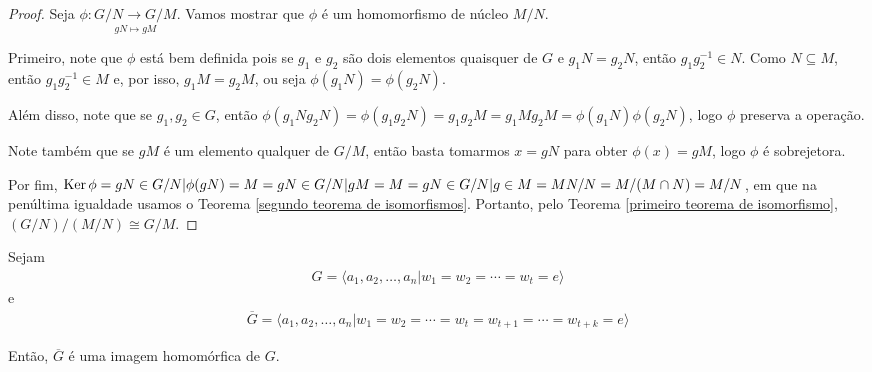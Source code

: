 	\begin{proof}
		Seja $\phi:\underset{gN\mapsto gM}{G/N\to G/M}$. Vamos mostrar que $\phi$ é um homomorfismo 
		de núcleo $M/N$.
		\par\vspace{0.3cm} Primeiro, note que $\phi$ está bem definida pois se $g_1$ e $g_2$ são 
		dois elementos quaisquer de $G$ e $g_1N=g_2N$, então $g_1g_2^{-1}\in N$. Como $N\subseteq M$, 
		então $g_1g_2^{-1}\in M$ e, por isso, $g_1M=g_2M$, ou seja $\phi(g_1N)=\phi(g_2N)$.
		
		\par\vspace{0.3cm} Além disso, note que se $g_1,g_2\in G$, então
		$\phi(g_1Ng_2N)=\phi(g_1g_2N)=g_1g_2M=g_1Mg_2M=\phi(g_1N)\phi(g_2N)$, logo $\phi$ preserva a operação.
		
		\par\vspace{0.3cm} Note também que se $gM$ é um elemento qualquer de $G/M$, então basta tomarmos 
		$x=gN$ para obter $\phi(x)=gM$, logo $\phi$ é sobrejetora.
		
		\par\vspace{0.3cm} Por fim,  $\operatorname{Ker}\phi={gN\in G/N|\phi(gN)=M}={gN\in G/N|gM=M}
		={gN\in G/N|g\in M}=MN/N=M/(M\cap N)=M/N$, em que na penúltima igualdade usamos o 
		Teorema \eqref{segundo teorema de isomorfismos}. Portanto, pelo 
		Teorema \eqref{primeiro teorema de isomorfismo}, $(G/N)/(M/N)\cong G/M$. 
	\end{proof}
	\begin{theorem}
	\label{teorema de Dyck}
		Sejam 
		\begin{align*}
		    G = \langle a_1, a_2, \dots, a_n | w_1 = w_2 = \cdots = w_t = e \rangle
		\end{align*} 
		e
		\begin{align*}
		    \overline{G} 
		    = \langle a_1, a_2, \dots, a_n | w_1 = w_2 = \cdots = w_t = w_{t+1} = \cdots = w_{t+k} = e \rangle
		\end{align*}
		\par\vspace{0.3cm} Então, $\overline{G}$ é uma imagem homomórfica de $G$.
	\end{theorem}
